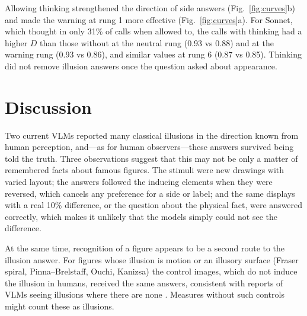 \documentclass[11pt]{article}
\begin{document}
Allowing thinking strengthened the direction of side answers (Fig.~\ref{fig:curves}b) and made the warning at rung 1
more effective (Fig.~\ref{fig:curves}a). For Sonnet, which thought in only 31\% of calls when allowed to, the calls
with thinking had a higher $D$ than those without at the neutral rung (0.93 vs 0.88) and at the warning rung (0.93 vs
0.86), and similar values at rung 6 (0.87 vs 0.85). Thinking did not remove illusion answers once the question asked
about appearance.

\begin{table}[p]
\centering
\scriptsize
\setlength{\tabcolsep}{3pt}

\caption{Per illusion: the direction $D$ (two-sided items) or stimulus effect $\Delta$ (yes/no items) at rung 0
(neutral) and rung 6 (truth) for the four settings. $^\dagger$: fewer than 10\% side answers, so $D$ rests on few
answers; --: no side answers. Control, r0: for two-sided items the share of the correct answer (``same'') on control
images, for yes/no items the share of the illusion word on control images (high values mean the figure is answered
from its shape), mean of the four settings. $\pm$10\%: share of correct answers on the control images with a real
10\% difference, mean of the four settings.}
\label{tab:illusions}
\end{table}

\section{Discussion}

Two current VLMs reported many classical illusions in the direction known from human perception, and---as for human
observers---these answers survived being told the truth. Three observations suggest that this may not be only a matter of remembered facts about famous figures. The stimuli were new drawings with varied layout; the answers followed the
inducing elements when they were reversed, which cancels any preference for a side or label; and the same displays
with a real 10\% difference, or the question about the physical fact, were answered correctly, which makes it unlikely that the models simply could not see the difference.

At the same time, recognition of a figure appears to be a second route to the illusion answer. For figures whose
illusion is motion or an illusory surface (Fraser spiral, Pinna--Brelstaff, Ouchi, Kanizsa) the control images, which
do not induce the illusion in humans, received the same answers, consistent with reports of VLMs seeing illusions
where there are none \citep{ullman2024illusion}. Measures without such controls might count these as illusions.
\end{document}
